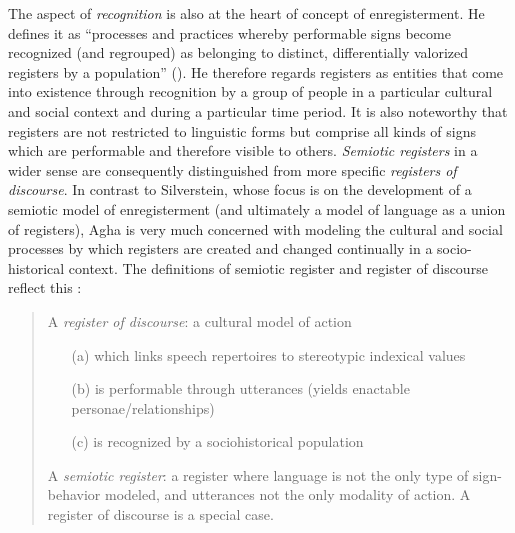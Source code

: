 The aspect of \emph{recognition} is also at the heart of  concept of enregisterment. He defines it as “processes and practices whereby performable signs become recognized (and regrouped) as belonging to distinct, differentially valorized registers by a population” (\citeyear[81]{Agha2007}). He therefore regards registers as entities that come into existence through recognition by a group of people in a particular cultural and social context and during a particular time period. It is also noteworthy that registers are not restricted to linguistic forms but comprise all kinds of signs which are performable and therefore visible to others. \textit{Semiotic registers} in a wider sense are consequently distinguished from more specific \textit{registers of discourse}. In contrast to Silverstein, whose focus is on the development of a semiotic model of enregisterment (and ultimately a model of language as a union of registers), Agha is very much concerned with modeling the cultural and social processes by which registers are created and changed continually in a socio-historical context. The definitions of semiotic register and register of discourse reflect this \citep[81]{Agha2007}:

\begin{quote}
A \emph{register of discourse}: a cultural model of action
\begin{itemize}
    \item[(a)]which links speech repertoires to stereotypic indexical values
    \item[(b)] is performable through utterances (yields enactable personae/relationships)
    \item[(c)] is recognized by a sociohistorical population
\end{itemize}
A \emph{semiotic register}: a register where language is not the only type of sign-behavior modeled, and utterances not the only modality of action. A register of discourse is a special case. 
\end{quote}

